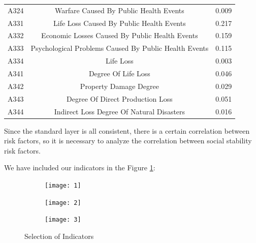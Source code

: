 \documentclass[12pt]{article}  %
\begin{document}
\begin{table}[!ht]
\begin{tabular}{ccc}
        A324 & Warfare Caused By Public Health Events &0.009 \\ 
        A331 & Life Loss Caused By Public Health Events &0.217\\ 
        A332 & Economic Losses Caused By Public Health Events &0.159 \\ 
        A333 & Psychological Problems Caused By Public Health Events &0.115 \\ 
        A334 & Life Loss &0.003 \\ 
        A341 & Degree Of Life Loss &0.046\\ 
        A342 & Property Damage Degree&0.029  \\ 
        A343 & Degree Of Direct Production Loss&0.051  \\ 
        A344 & Indirect Loss Degree Of Natural Disasters&0.016  \\ \hline
    \end{tabular}
\end{table}

Since the standard layer is all consistent, there is a certain correlation between risk factors, so it is necessary to analyze the correlation between social stability risk factors.

We have included our indicators in the Figure \ref{soi}:
\begin{figure}[htbp]
\centering
\begin{subfigure}[b]{.32\textwidth}
\texttt{[image: 1]}
\end{subfigure}
\begin{subfigure}[b]{.32\textwidth}
\texttt{[image: 2]}
\end{subfigure}
\begin{subfigure}[b]{.32\textwidth}
\texttt{[image: 3]}
\end{subfigure}
\caption{Selection of Indicators}\label{soi}
\end{figure}
\end{document}
